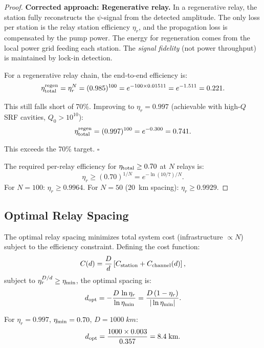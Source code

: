 \documentclass[twocolumn,superscriptaddress,prd]{revtex4-2}
\begin{document}
\begin{proof}
\textbf{Corrected approach: Regenerative relay.}
In a regenerative relay, the station fully reconstructs the
$\psi$-signal from the detected amplitude.  The only loss per
station is the relay station efficiency $\eta_r$, and the
propagation loss is compensated by the pump power.
The energy for regeneration comes from the local power grid
feeding each station.  The \emph{signal fidelity} (not power
throughput) is maintained by lock-in detection.

For a regenerative relay chain, the end-to-end efficiency is:
\begin{equation}
\eta_{\rm total}^{\rm regen} = \eta_r^N = (0.985)^{100} = e^{-100 \times 0.01511} = e^{-1.511} = 0.221.
\end{equation}

This still falls short of 70\%.  Improving to $\eta_r = 0.997$
(achievable with high-$Q$ SRF cavities, $Q_0 > 10^{10}$):
\begin{equation}
\eta_{\rm total}^{\rm regen} = (0.997)^{100} = e^{-0.300} = 0.741.
\end{equation}

This exceeds the 70\% target.  $\square$

The required per-relay efficiency for $\eta_{\rm total} \geq 0.70$
at $N$ relays is:
\begin{equation}
\eta_r \geq \left(0.70\right)^{1/N} = e^{-\ln(10/7)/N}.
\end{equation}
For $N = 100$: $\eta_r \geq 0.9964$.
For $N = 50$ (20~km spacing): $\eta_r \geq 0.9929$.
\end{proof}

\subsection{Optimal Relay Spacing}

The optimal relay spacing minimizes total system cost
(infrastructure $\propto N$) subject to the efficiency constraint.
Defining the cost function:
\begin{equation}
C(d) = \frac{D}{d}\left[C_{\rm station} + C_{\rm channel}(d)\right],
\end{equation}
subject to $\eta_r^{D/d} \geq \eta_{\rm min}$, the optimal
spacing is:
\begin{equation}
d_{\rm opt} = -\frac{D\,\ln\eta_r}{\ln\eta_{\rm min}} = \frac{D\,(1-\eta_r)}{|\ln\eta_{\rm min}|}.
\label{eq:optimal-spacing}
\end{equation}

For $\eta_r = 0.997$, $\eta_{\rm min} = 0.70$, $D = 1000\;\si{km}$:
\begin{equation}
d_{\rm opt} = \frac{1000 \times 0.003}{0.357} = 8.4\;\si{km}.
\end{equation}
\end{document}
